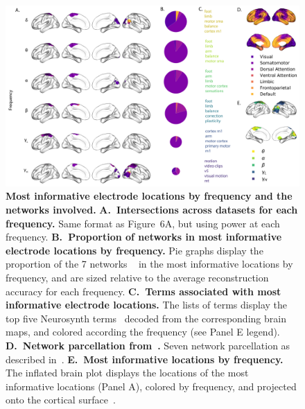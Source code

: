 \documentclass[10pt]{article}
\begin{document}
\begin{figure}[p]
\centering
\includegraphics[width=\textwidth]{figs/supplemental_5}
\caption{\textbf{Most informative electrode locations by frequency
      and the networks involved.}
    \textbf{A.~Intersections across datasets for each frequency.}  Same format as Figure~6A, but
    using power at each frequency.
    \textbf{B.~Proportion of networks in most informative electrode locations by
    frequency.}  Pie graphs display the proportion of the 7 networks
  ~\citep{YeoEtal11} in the most informative locations by
  frequency, and are sized relative to the average reconstruction
  accuracy for each frequency. \textbf{C.~Terms associated with most informative
    electrode locations.}  The
    lists of terms display the top five Neurosynth
    terms~\citep{RubiEtal17} decoded from the corresponding brain
    maps, and colored according the frequency (see Panel
    E legend). \textbf{D.~Network parcellation from~\citep{YeoEtal11}.}
    Seven network parcellation as described
    in~\citep{YeoEtal11}. \textbf{E.~Most informative locations by
      frequency.} The inflated brain plot displays the locations of
    the most informative locations (Panel A), colored by frequency,
    and projected onto the cortical surface~\citep{CombEtal19}.}
\label{fig:supplemental_5}
\end{figure}
\end{document}

